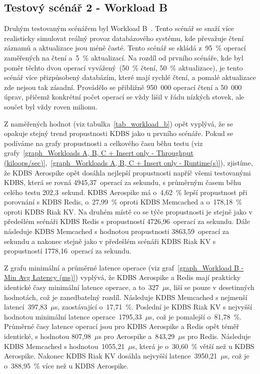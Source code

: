 \documentclass[czech,master,dept460,male,csharp,cpdeclaration]{diploma}
\begin{document}
	\subsection{Testový scénář 2 - Workload B}
	
	Druhým testovaným scénářem byl Workload B~\cite{workloads}. Tento scénář se snaží více realisticky simulovat reálný provoz databázového systému, kde převažuje čtení záznamů a aktualizace jsou méně časté. Tento scénář se skládá z~95~\% operací zaměřených na čtení a~5~\% aktualizací. Na rozdíl od prvního scénáře, kde byl poměr těchto dvou operací vyvážený~(50~\% čtení, 50~\% aktualizace), je tento scénář více přizpůsobený databázím, které mají rychlé čtení, a pomalé aktualizace zde nejsou tak zásadní. Provádělo se přibližně 950~000 operací čtení a 50~000 úprav, přičemž konkrétní počet operací se vždy lišil v řádu nízkých stovek, ale součet byl vždy roven milionu.
	
	Z naměřených hodnot (viz tabulka~\ref{tab_workload_b}) opět vyplývá, že se opakuje stejný trend propustnosti KDBS jako u prvního scénáře. Pokud se podíváme na grafy propustnosti a celkového času běhu testu (viz grafy~\ref{graph_Workloads A, B, C + Insert only - Throughput (kiloops/sec)},~\ref{graph_Workloads A, B, C + Insert only - Runtime(s)}), zjistíme, že KDBS Aerospike opět dosáhla nejlepší propustnosti napříč všemi testovanými KDBS, která se rovná 4945,37~operací za sekundu, s průměrným časem běhu celého testu 202,3~sekund. KDBS Aerospike má o~4,62~\% lepší propustnost při porovnání s KDBS Redis, o~27,99~\% oproti KDBS Memcached a o~178,18~\% oproti KDBS Riak KV. Na druhém místě co se týče propustnosti je stejně jako v předešlém scénáři KDBS Redis s propustností 4726,96~operací za sekundu. Dále následuje KDBS Memcached s hodnotou propustnosti 3863,59~operací za sekundu a nakonec stejně jako v předešlém scénáři KDBS Riak KV s propustností 1778,16~operací za sekundu.
	
	Z grafu minimální a průměrné latence operace (viz graf~\ref{graph_Workload B - Min Avg Latency (ms)}) vyplývá, že KDBS Aerospike a Redis mají prakticky identické časy minimální latence operace, a to~327~$\mu$s, liší se pouze v desetinných hodnotách, což je zanedbatelný rozdíl. Následuje KDBS Memcached s nejmenší latencí~397,83~$\mu$s, zaostávající o~17,71~\%. Poslední je KDBS Riak KV s nejvyšší hodnotou minimální latence operace~1795,33~$\mu$s, což je pomalejší o~81,78~\%. Průměrné časy latence operací jsou pro KDBS Aerospike a Redis opět téměř identické, s hodnotou 807,98~$\mu$s pro Aerospike a~843,29~$\mu$s pro Redis. Následuje KDBS Memcached s hodnotou~1055,21~$\mu$s, která je o~30,60~\% větší než u KDBS Aerospike. Nakonec KDBS Riak KV dosáhla nejvyšší latence~3950,21~$\mu$s, což je o~388,95~\% více než u KDBS Aerospike.
	
\end{document}
